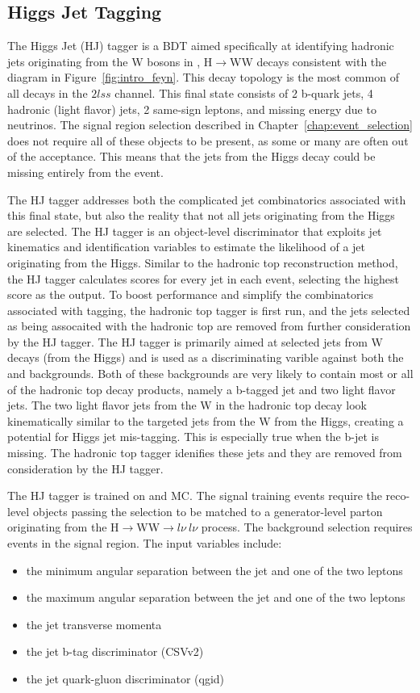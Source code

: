 \subsection{Higgs Jet Tagging}
The Higgs Jet (HJ) tagger is a BDT aimed specifically at identifying hadronic jets originating from the W bosons in \tth, H$\rightarrow$WW decays consistent
with the \tth diagram in Figure~\ref{fig:intro_feyn}. This decay topology is the most common of all \tth decays in the $2lss$ channel. This final state
consists of 2 b-quark jets, 4 hadronic (light flavor) jets, 2 same-sign leptons, and missing energy due to neutrinos. The signal region selection described
in Chapter~\ref{chap:event_selection} does not require all of these objects to be present, as some or many are often out of the acceptance. This means that
the jets from the Higgs decay could be missing entirely from the event.

The HJ tagger addresses both the complicated jet combinatorics associated with this final state, but also the reality that not all jets originating
from the Higgs are selected. The HJ tagger is an object-level discriminator that exploits jet kinematics and identification variables to estimate the likelihood
of a jet originating from the Higgs. Similar to the hadronic top reconstruction method, the HJ tagger calculates scores for every jet in each event, selecting
the highest score as the output. To boost performance and simplify the combinatorics associated with tagging, the hadronic top tagger is first run,
and the jets selected as being assocaited with the hadronic top are removed from further consideration by the HJ tagger.
The HJ tagger is primarily aimed at selected jets from W decays (from the Higgs) and is used as a discriminating varible against both the \ttw and \ttz backgrounds.
Both of these
backgrounds are very likely to contain most or all of the hadronic top decay products, namely a b-tagged jet and two light flavor jets. The two light flavor jets from
the W in the hadronic top decay look kinematically similar to the targeted jets from the W from the Higgs, creating a potential for Higgs jet mis-tagging. This is
especially true when the b-jet is missing. The hadronic top tagger idenifies these jets and they are removed from consideration by the HJ tagger.

The HJ tagger is trained on \tth and \ttv MC. The signal training events require the reco-level objects passing the selection to be matched to a generator-level parton
originating from the H$\rightarrow$WW$\rightarrow l\nu~l\nu$ process. The background selection requires \ttv events in the signal region.  
The input variables include:
\begin{itemize}
\item the minimum angular separation between the jet and one of the two leptons
\item the maximum angular separation between the jet and one of the two leptons
\item the jet transverse momenta
\item the jet b-tag discriminator (CSVv2)
\item the jet quark-gluon discriminator (qgid)
\end{itemize}

